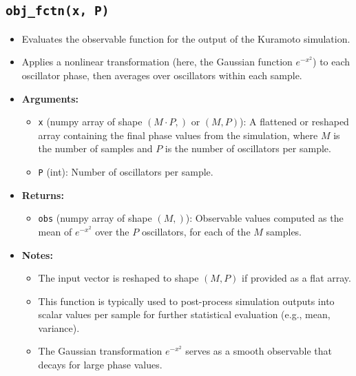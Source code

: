 \documentclass{article}
\begin{document}
\subsection{\texttt{obj\_fctn(x, P)}}
\begin{itemize}
    \item Evaluates the observable function for the output of the Kuramoto simulation.
    \item Applies a nonlinear transformation (here, the Gaussian function $e^{-x^2}$) to each oscillator phase, then averages over oscillators within each sample.
    
    \item \textbf{Arguments:}
    \begin{itemize}
        \item \texttt{x} (numpy array of shape $(M \cdot P,)$ or $(M, P)$): A flattened or reshaped array containing the final phase values from the simulation, where $M$ is the number of samples and $P$ is the number of oscillators per sample.
        \item \texttt{P} (int): Number of oscillators per sample.
    \end{itemize}
    
    \item \textbf{Returns:}
    \begin{itemize}
        \item \texttt{obs} (numpy array of shape $(M,)$): Observable values computed as the mean of $e^{-x^2}$ over the $P$ oscillators, for each of the $M$ samples.
    \end{itemize}
    
    \item \textbf{Notes:}
    \begin{itemize}
        \item The input vector is reshaped to shape $(M, P)$ if provided as a flat array.
        \item This function is typically used to post-process simulation outputs into scalar values per sample for further statistical evaluation (e.g., mean, variance).
        \item The Gaussian transformation $e^{-x^2}$ serves as a smooth observable that decays for large phase values.
    \end{itemize}
\end{itemize}
\end{document}
